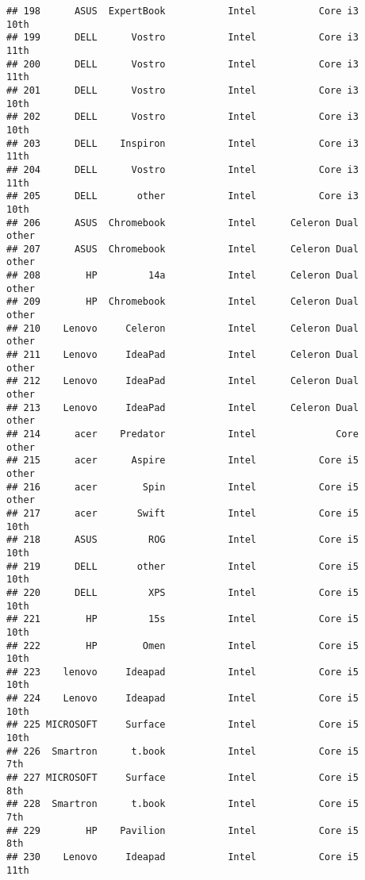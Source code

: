 \documentclass[
]{article}
\begin{document}
\begin{verbatim}
## 198      ASUS  ExpertBook           Intel           Core i3            10th
## 199      DELL      Vostro           Intel           Core i3            11th
## 200      DELL      Vostro           Intel           Core i3            11th
## 201      DELL      Vostro           Intel           Core i3            10th
## 202      DELL      Vostro           Intel           Core i3            10th
## 203      DELL    Inspiron           Intel           Core i3            11th
## 204      DELL      Vostro           Intel           Core i3            11th
## 205      DELL       other           Intel           Core i3            10th
## 206      ASUS  Chromebook           Intel      Celeron Dual           other
## 207      ASUS  Chromebook           Intel      Celeron Dual           other
## 208        HP         14a           Intel      Celeron Dual           other
## 209        HP  Chromebook           Intel      Celeron Dual           other
## 210    Lenovo     Celeron           Intel      Celeron Dual           other
## 211    Lenovo     IdeaPad           Intel      Celeron Dual           other
## 212    Lenovo     IdeaPad           Intel      Celeron Dual           other
## 213    Lenovo     IdeaPad           Intel      Celeron Dual           other
## 214      acer    Predator           Intel              Core           other
## 215      acer      Aspire           Intel           Core i5           other
## 216      acer        Spin           Intel           Core i5           other
## 217      acer       Swift           Intel           Core i5            10th
## 218      ASUS         ROG           Intel           Core i5            10th
## 219      DELL       other           Intel           Core i5            10th
## 220      DELL         XPS           Intel           Core i5            10th
## 221        HP         15s           Intel           Core i5            10th
## 222        HP        Omen           Intel           Core i5            10th
## 223    lenovo     Ideapad           Intel           Core i5            10th
## 224    Lenovo     Ideapad           Intel           Core i5            10th
## 225 MICROSOFT     Surface           Intel           Core i5            10th
## 226  Smartron      t.book           Intel           Core i5             7th
## 227 MICROSOFT     Surface           Intel           Core i5             8th
## 228  Smartron      t.book           Intel           Core i5             7th
## 229        HP    Pavilion           Intel           Core i5             8th
## 230    Lenovo     Ideapad           Intel           Core i5            11th

\end{verbatim}
\end{document}
